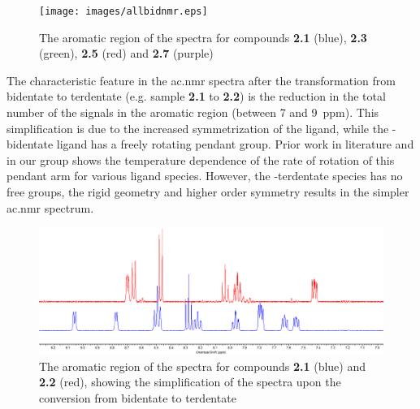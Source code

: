 \begin{figure}[!htb]
 \begin{center}
  \texttt{[image: images/allbidnmr.eps]}
 \end{center}
\caption[The aromatic region of the \texorpdfstring{}{1H}  spectra of the four bidentate compounds]{The aromatic region of the \texorpdfstring{}{1H}  spectra for compounds \textbf{2.1} (blue), \textbf{2.3} (green), \textbf{2.5} (red) and \textbf{2.7} (purple)}
\label{fig.bid4nmr}
\end{figure} 

The characteristic feature in the \gls{ac.nmr} spectra after the transformation from bidentate to terdentate (e.g. sample \textbf{2.1} to \textbf{2.2}) is the reduction in the total number of the signals in the aromatic region (between 7 and 9~ppm). This simplification is due to the increased symmetrization of the ligand, while the -bidentate ligand has a freely rotating pendant group. Prior work in literature\autocite{abel1993} and in our group\autocite{jurca2012} shows the temperature dependence of the rate of rotation of this pendant arm for various ligand species. However, the -terdentate species has no free groups, the rigid geometry and higher order symmetry results in the simpler \gls{ac.nmr} spectrum.

\begin{figure}[!htb]
 \begin{center}
  \includegraphics[clip=true, width=\textwidth, keepaspectratio]{images/bidternmr.eps}
 \end{center}
\caption[The aromatic region of the \texorpdfstring{}{1H}  spectra showing bidentate - terdentate conversion]{The aromatic region of the \texorpdfstring{}{1H}  spectra for compounds \textbf{2.1} (blue) and \textbf{2.2} (red), showing the simplification of the spectra upon the conversion from bidentate to terdentate}
\label{fig.bidtoter}
\end{figure} 

